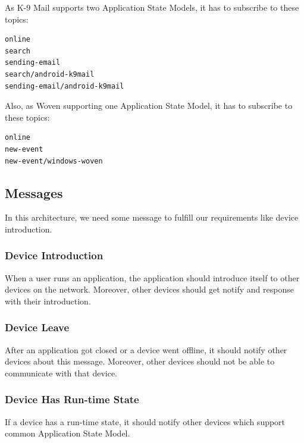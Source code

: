 As K-9 Mail supports two Application State Models, it has to subscribe to these topics:
\begin{verbatim}
online
search
sending-email
search/android-k9mail
sending-email/android-k9mail
\end{verbatim}


Also, as Woven supporting one Application State Model, it has to subscribe to these topics:
\begin{verbatim}
online
new-event
new-event/windows-woven
\end{verbatim}



\subsection{Messages}
In this architecture, we need some message to fulfill our requirements like device introduction.

\subsubsection{Device Introduction}
When a user runs an application, the application should introduce itself to other devices on the network. Moreover, other devices should get notify and response with their introduction.

\subsubsection{Device Leave}
After an application got closed or a device went offline, it should notify other devices about this message. Moreover, other devices should not be able to communicate with that device.

\subsubsection{Device Has Run-time State}
If a device has a run-time state, it should notify other devices which support  common Application State Model.

